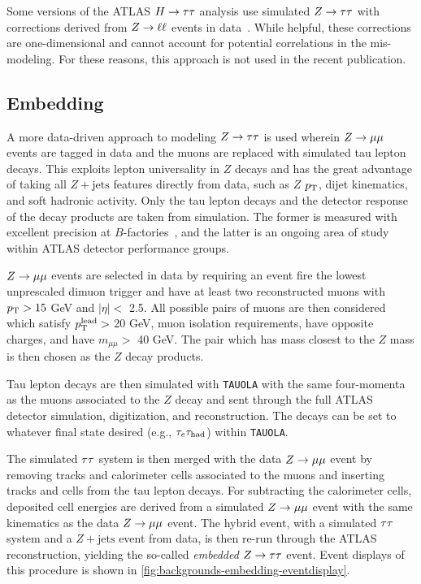Some versions of the ATLAS $H\rightarrow\tau\tau$ analysis use simulated $Z\rightarrow\tau\tau$ with corrections derived from $Z \rightarrow \ell\ell$ events in data~\cite{ATLAS-CONF-2012-160}. While helpful, these corrections are one-dimensional and cannot account for potential correlations in the mis-modeling. For these reasons, this approach is not used in the recent publication.

\subsection{Embedding}

A more data-driven approach to modeling $Z\rightarrow\tau\tau$ is used wherein $Z \rightarrow \mu\mu$ events are tagged in data and the muons are replaced with simulated tau lepton decays. This exploits lepton universality in $Z$ decays and has the great advantage of taking all $Z\!+\text{jets}$ features directly from data, such as $Z$ $p_{\mathrm{T}}$, dijet kinematics, and soft hadronic activity. Only the tau lepton decays and the detector response of the decay products are taken from simulation. The former is measured with excellent precision at $B$-factories~\cite{2014.hfag}, and the latter is an ongoing area of study within ATLAS detector performance groups.

$Z \rightarrow \mu\mu$ events are selected in data by requiring an event fire the lowest unprescaled dimuon trigger and have at least two reconstructed muons with $p_{\mathrm{T}} > 15$ GeV and $|\eta| <$ 2.5. All possible pairs of muons are then considered which satisfy $p_{\mathrm{T}}^\text{lead} > $ 20 GeV, muon isolation requirements, have opposite charges, and have $m_{\mu\mu} > $ 40 GeV. The pair which has mass closest to the $Z$ mass is then chosen as the $Z$ decay products.

Tau lepton decays are then simulated with \texttt{TAUOLA} with the same four-momenta as the muons associated to the $Z$ decay and sent through the full ATLAS detector simulation, digitization, and reconstruction. The decays can be set to whatever final state desired (e.g., $\tau_e \tau_\text{had}$) within \texttt{TAUOLA}. 

The simulated $\tau\tau$ system is then merged with the data $Z \rightarrow \mu\mu$ event by removing tracks and calorimeter cells associated to the muons and inserting tracks and cells from the tau lepton decays. For subtracting the calorimeter cells, deposited cell energies are derived from a simulated $Z \rightarrow \mu\mu$ event with the same kinematics as the data $Z \rightarrow \mu\mu$ event. The hybrid event, with a simulated $\tau\tau$ system and a $Z\!+\text{jets}$ event from data, is then re-run through the ATLAS reconstruction, yielding the so-called \textit{embedded} $Z\rightarrow\tau\tau$ event. Event displays of this procedure is shown in \cref{fig:backgrounds-embedding-eventdisplay}.

